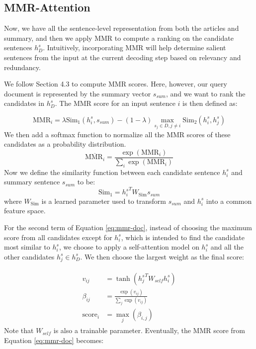 \documentclass[11pt,a4paper]{article}
\begin{document}
\subsection{MMR-Attention}

Now, we have all the sentence-level representation from both the articles and summary, and then we apply MMR to compute a ranking on the candidate sentences $h^{s}_D$. Intuitively, incorporating MMR will help determine salient sentences from the input at the current decoding step based on relevancy and redundancy. 

We follow Section 4.3 to compute MMR scores. Here, however, our query document is represented by the summary vector $s_{sum}$, and we want to rank the candidates in $h^{s}_D$. The MMR score for an input sentence $i$ is then defined as:



\begin{dmath} 
\label{eq:mmr-doc}
{ {\text{MMR}} _{i} } =  \lambda { \text{Sim} }_{ 1 } (h^{s}_ {i },s_{sum})-(1-\lambda )\max _{ {s_j} \in D, j \neq i }{ \text{Sim}_2 }(h^{s}_ {i },h^{s}_ {j } ) 
\end{dmath}
We then add a softmax function to normalize all the MMR scores of these candidates as a probability distribution.
\begin{dmath} 
\label{eq:mmr-doc-softmax}
\overline{{\text{MMR}}_{ i}}  = \frac{\exp({ {\text{MMR}} _{i} })}{\sum_{i}{\exp({ {\text{MMR}} _{ i} })}}
\end{dmath}
Now we define the similarity function between each candidate sentence $h^s_{i}$ and summary sentence $s_{sum}$ to be:
\begin{equation}
    {\text{Sim}}_1 = {h^s_{i}}^T W_{\text{Sim}} s_{sum}
\end{equation}
where $W_{\text{Sim}}$ is a learned parameter used to transform $s_{sum}$ and ${h^s_{i}}$ into a common feature space. 



For the second term of Equation \ref{eq:mmr-doc}, instead of choosing the maximum score from all candidates except for $h^s_{i}$, which is intended to find the candidate most similar to $h^s_{i}$, we choose to apply a self-attention model on $h^s_{i}$ and all the other candidates $h^s_{j}\in  h^{s}_D$. We then choose the largest weight as the final score:

\vspace{-4mm}
\begin{align} 
\begin{split}
\label{topic}
    v _ {ij} & = \tanh \left({ h^s_{j}}^T W _ {self}h^s_{i} \right) \\ 
    \beta _ { i j } & = \frac { \exp \left(  v _ { i j } \right) } { \sum _ { j } \exp \left(  v _ { i j } \right) } \\ 
    \text{score}_{i} & = \max_{j} (\beta_{i,j})  
\end{split}
\end{align}
Note that $W_{self}$ is also a trainable parameter. Eventually, the MMR score from Equation \ref{eq:mmr-doc} becomes:
\end{document}
